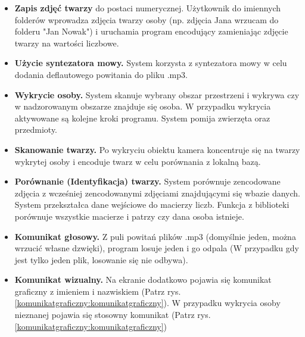 \documentclass[a4paper,12pt,reqno]{article}
\begin{document}
\begin{itemize}
	\item \textbf{Zapis zdjęć twarzy} do postaci numerycznej. Użytkownik do imiennych folderów wprowadza zdjęcia twarzy osoby (np. zdjęcia Jana wrzucam do folderu "Jan Nowak") i uruchamia program encodujący zamieniając zdjęcie twarzy na wartości liczbowe.
	\item \textbf{Użycie syntezatora mowy.} System korzysta z syntezatora mowy w celu dodania deflautowego powitania do pliku .mp3.
	\item \textbf{Wykrycie osoby.} System skanuje wybrany obszar przestrzeni i wykrywa czy w nadzorowanym obszarze znajduje się osoba. W przypadku wykrycia aktywowane są kolejne kroki programu. System pomija zwierzęta oraz przedmioty.
	\item \textbf{Skanowanie  twarzy.} Po wykryciu obiektu kamera koncentruje się na twarzy wykrytej osoby i encoduje twarz w celu porównania z lokalną bazą.
	\item \textbf{Porównanie (Identyfikacja) twarzy.} System porównuje zencodowane zdjęcia z wcześniej zencodowanymi zdjęciami znajdującymi się wbazie danych. System przekształca dane wejściowe do macierzy liczb. Funkcja z biblioteki porównuje wszystkie macierze i patrzy czy dana osoba istnieje.
	\item \textbf{Komunikat głosowy.} Z puli powitań plików .mp3 (domyślnie jeden, można wrzucić własne dzwięki), program losuje jeden i go odpala (W przypadku gdy jest tylko jeden plik, losowanie się nie odbywa).
	\item \textbf{Komunikat wizualny.} Na ekranie dodatkowo pojawia się komunikat graficzny z imieniem i nazwiskiem (Patrz rys. \ref{komunikatgraficzny:komunikatgraficzny}). W przypadku wykrycia osoby nieznanej pojawia się stosowny komunikat (Patrz rys. \ref{komunikatgraficzny:komunikatgraficzny})
\end{itemize}
\end{document}
